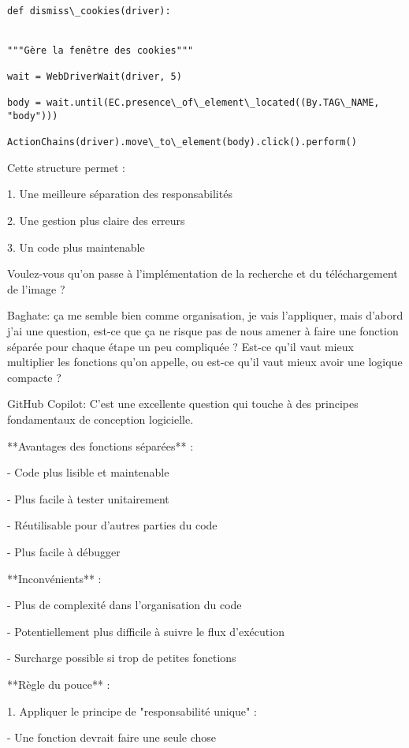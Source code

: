 \begin{verbatim}

def dismiss\_cookies(driver):


"""Gère la fenêtre des cookies"""

wait = WebDriverWait(driver, 5)

body = wait.until(EC.presence\_of\_element\_located((By.TAG\_NAME, "body")))

ActionChains(driver).move\_to\_element(body).click().perform()

\end{verbatim}

Cette structure permet :

1. Une meilleure séparation des responsabilités

2. Une gestion plus claire des erreurs

3. Un code plus maintenable

Voulez-vous qu'on passe à l'implémentation de la recherche et du téléchargement de l'image ?

Baghate: ça me semble bien comme organisation, je vais l'appliquer, mais d'abord j'ai une question, est-ce que ça ne risque pas de nous amener à faire une fonction séparée pour chaque étape un peu compliquée ? Est-ce qu'il vaut mieux multiplier les fonctions qu'on appelle, ou est-ce qu'il vaut mieux avoir une logique compacte ?

GitHub Copilot: C'est une excellente question qui touche à des principes fondamentaux de conception logicielle.

**Avantages des fonctions séparées** :

- Code plus lisible et maintenable

- Plus facile à tester unitairement

- Réutilisable pour d'autres parties du code

- Plus facile à débugger

**Inconvénients** :

- Plus de complexité dans l'organisation du code

- Potentiellement plus difficile à suivre le flux d'exécution

- Surcharge possible si trop de petites fonctions

**Règle du pouce** :

1. Appliquer le principe de "responsabilité unique" :

- Une fonction devrait faire une seule chose

